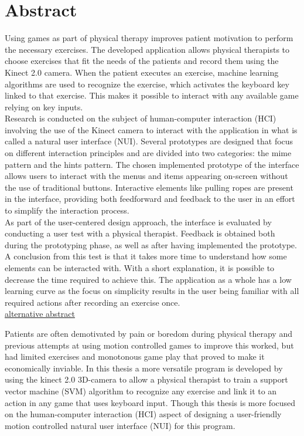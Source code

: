 \chapter*{Abstract}

Using games as part of physical therapy improves patient motivation to perform the necessary exercises. The developed application allows physical therapists to choose exercises that fit the needs of the patients and record them using the Kinect 2.0 camera. When the patient executes an exercise, machine learning algorithms are used to recognize the exercise, which activates the keyboard key linked to that exercise. This makes it possible to interact with any available game relying on key inputs.\\

Research is conducted on the subject of human-computer interaction (HCI) involving the use of the Kinect camera to interact with the application in what is called a natural user interface (NUI). Several prototypes are designed that focus on different interaction principles and are divided into two categories: the mime pattern and the hints pattern. The chosen implemented prototype of the interface allows users to interact with the menus and items appearing on-screen without the use of traditional buttons. Interactive elements like pulling ropes are present in the interface, providing both feedforward and feedback to the user in an effort to simplify the interaction process.\\

As part of the user-centered design approach, the interface is evaluated by conducting a user test with a physical therapist. Feedback is obtained both during the prototyping phase, as well as after having implemented the prototype. A conclusion from this test is that it takes more time to understand how some elements can be interacted with. With a short explanation, it is possible to decrease the time required to achieve this. The application as a whole has a low learning curve as the focus on simplicity results in the user being familiar with all required actions after recording an exercise once.\\

\underline{alternative abstract}

Patients are often demotivated by pain or boredom during physical therapy and previous attempts at using motion controlled games to improve this worked, but had limited exercises and monotonous game play that proved to make it economically inviable. In this thesis a more versatile program is developed by using the kinect 2.0 3D-camera to allow a physical therapist to train a support vector machine (SVM) algorithm to recognize any exercise and link it to an action in any game that uses keyboard input. Though this thesis is more focused on the human-computer interaction (HCI) aspect of designing a user-friendly motion controlled natural user interface (NUI) for this program.\\

